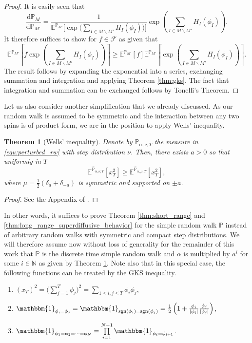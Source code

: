 \documentclass[reqno,11pt]{amsart}
\newcommand{\1}{\mathds{1}}
\theoremstyle{plain}
\newtheorem{theorem}{Theorem}[section]
\theoremstyle{definition}
\numberwithin{equation}{section}
\newcommand{\caF}{{\mathcal F}}
\newcommand{\bbE}{{\mathbb E}}
\newcommand{\bbN}{{\mathbb N}}
\newcommand{\bbP}{{\mathbb P}}
\newcommand{\de}{{\mathrm{d}}}
\newcommand{\one}{{\mathbbm{1}}}
\newcommand{\bbPh}{\hat{\bbP}}
\def\lt{\left}
\def\rt{\right}
\begin{document}
\begin{proof}
    It is easily seen that 
    $$\frac{\de \bbP_M}{\de \bbP_{M'}}= \frac{1}{\bbE^{\bbP_{M'}}\Big[ \exp \Big( \sum_{I \in M \backslash M'} H_I(\phi_I)\Big)\Big]} \exp \lt( \sum\limits_{I \in M \backslash M'} H_I(\phi_I) \rt).$$
    It therefore suffices to show for $f \in \caF$ as given that
    $$\bbE^{\bbP_{M'}} \lt[f \exp \lt( \sum\limits_{I \in M \backslash M'} H_I(\phi_I) \rt) \rt] \ge \bbE^{\bbP_{M'}} \lt[ f \rt] \bbE^{\bbP_{M'}} \lt[ \exp \lt( \sum\limits_{I \in M \backslash M'} H_I(\phi_I) \rt) \rt].$$
    The result follows by expanding the exponential into a series, exchanging summation and integration and applying Theorem \ref{thm:gks}. The fact that integration and summation can be exchanged follows by Tonelli's Theorem.
\end{proof}

Let us also consider another simplification that we already discussed. As our random walk is assumed to be symmetric and the interaction between any two spins is of product form, we are in the position to apply Wells' inequality. 
\begin{theorem}[Wells' inequality]
    \label{thm:wells_inequality}
    Denote by $\bbPh_{\alpha,\nu,T}$ the measure in \eqref{equ:perturbed_rw} with step distribution $\nu$. Then, there exists $a > 0$ so that uniformly in $T$
    $$\bbE^{\bbPh_{\alpha,\nu,T}} [x_T ^2] \ge \bbE^{\bbPh_{\alpha,\mu,T}} [x_T ^2],$$
    where $\mu = \frac 1 2 ( \delta_a + \delta_{-a})$ is symmetric and supported on $\pm a$. 
\end{theorem}
\begin{proof}
    See the Appendix of \cite{BrLePf81}.
\end{proof}

In other words, it suffices to prove Theorem \ref{thm:short_range} and \ref{thm:long_range_superdiffusive_behavior} for the simple random walk $\bbP$ instead of arbitrary random walks with symmetric and compact step distributions. We will therefore assume now without loss of generality for the remainder of this work that $\bbP$ is the discrete time simple random walk and $\alpha$ is multiplied by $a^i$ for some $i \in \bbN$ as given by Theorem \ref{thm:wells_inequality}. 
Note also that in this special case, the following functions can be treated by the GKS inequality.
\begin{enumerate}
    \item $(x_T)^2 = \Big( \sum\limits_{j=1} ^T \phi_j \Big)^2 = \sum\limits_{1 \le i, j \le T} \phi_i \phi_j$,
    \item $\one_{\phi_i = \phi_j} = \one_{\text{sgn}(\phi_i) = \text{sgn}(\phi_j)} =  \frac 1 2 \lt(1 + \frac{\phi_i}{|\phi_i|}\frac{\phi_j}{|\phi_j|}\rt)$,
    \item $\one_{\phi_1 = \phi_2 = \dots = \phi_N} = \prod\limits_{i=1} ^{N-1} \one_{\phi_i = \phi_{i+1}}$.
\end{enumerate}
\end{document}
